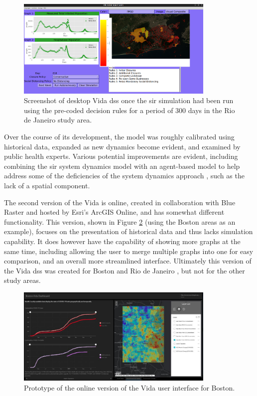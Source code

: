 \begin{figure}[!htb]
\centering
\includegraphics[width=0.85\textwidth]{Figures/chap5/vida-screenshot-simulation.png}
\caption[Vida DSS SIR Simulation Screenshot]{Screenshot of desktop Vida \ac{dss} once the \ac{sir} simulation had been run using the pre-coded decision rules for a period of 300 days in the Rio de Janeiro study area.}
\label{fig:vida-dss-simulation}
\end{figure}

Over the course of its development, the model was roughly calibrated using historical data, expanded as new dynamics become evident, and examined by public health experts. Various potential improvements are evident, including combining the \ac{sir} system dynamics model with an agent-based model to help address some of the deficiencies of the system dynamics approach \cite{ahmedVarianceSystemDynamics2012}, such as the lack of a spatial component.

The second version of the Vida is online, created in collaboration with Blue Raster and hosted by Esri's ArcGIS Online, and has somewhat different functionality. This version, shown in Figure \ref{fig:vidab} (using the Boston areas as an example), focuses on the presentation of historical data and thus lacks simulation capability. It does however have the capability of showing more graphs at the same time, including allowing the user to merge multiple graphs into one for easy comparison, and an overall more streamlined interface. Ultimately this version of the Vida \ac{dss} was created for Boston \cite{bluerasterMITVidaSupportBoston2021} and Rio de Janeiro \cite{bluerasterRioJaneiroVida2021}, but not for the other study areas.

\begin{figure}[!htb]
\centering
\includegraphics[width=0.85\textwidth]{Figures/chap5/VidaBlueScreenshot.jpg}
\caption{Prototype of the online version of the Vida user interface for Boston.}
\label{fig:vidab}
\end{figure}

